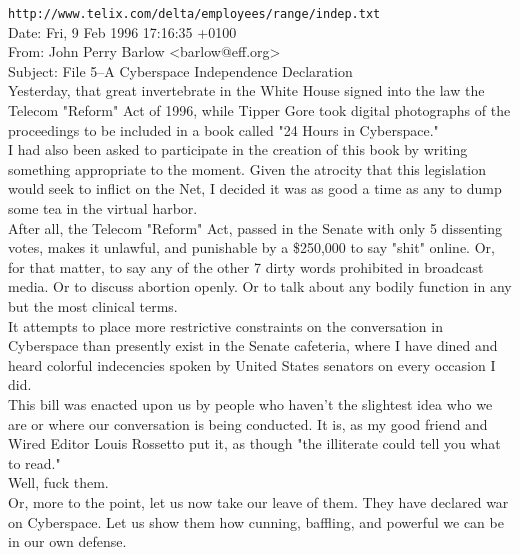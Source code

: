 \documentclass[11pt,twoside,a4paper]{book}
\begin{document}
\begin{minipage}[ht]{1.00\textwidth}
	\small
	\texttt{http://www.telix.com/delta/employees/range/indep.txt} ~\\ 
	
	Date: Fri, 9 Feb 1996 17:16:35 +0100 ~\\
	From: John Perry Barlow <barlow@eff.org> ~\\
	Subject: File 5--A Cyberspace Independence Declaration ~\\
	
	Yesterday, that great invertebrate in the White House signed into the law the Telecom "Reform" Act of 1996, while Tipper Gore took digital photographs of the proceedings to be included in a book called "24 Hours in Cyberspace." ~\\
	
	I had also been asked to participate in the creation of this book by writing something appropriate to the moment. Given the atrocity that this legislation would seek to inflict on the Net, I decided it was as good a time as any to dump some tea in the virtual harbor. ~\\
	
	After all, the Telecom "Reform" Act, passed in the Senate with only 5 dissenting votes, makes it unlawful, and punishable by a \$250,000 to say "shit" online. Or, for that matter, to say any of the other 7 dirty words prohibited in broadcast media. Or to discuss abortion openly. Or to talk about any bodily function in any but the most clinical terms. ~\\
	
	It attempts to place more restrictive constraints on the conversation in Cyberspace than presently exist in the Senate cafeteria, where I have dined and heard colorful indecencies spoken by United States senators on every occasion I did. ~\\
	
	This bill was enacted upon us by people who haven't the slightest idea who we are or where our conversation is being conducted. It is, as my good friend and Wired Editor Louis Rossetto put it, as though "the illiterate could tell you what to read." ~\\
	
	Well, fuck them. ~\\
	
	Or, more to the point, let us now take our leave of them. They have declared war on Cyberspace. Let us show them how cunning, baffling, and powerful we can be in our own defense. ~\\
	

\end{minipage}
\end{document}
